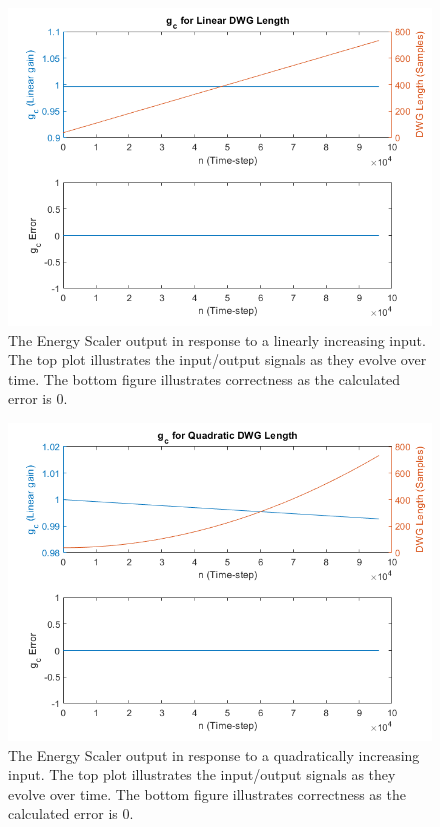 \documentclass[../main.tex]{subfiles}
\begin{document}
\begin{figure}[h!]
    \centering
    \includegraphics[scale=.65]{./images/plots/EnergyScalerLinearIncreasing.png}
    \caption{The Energy Scaler output in response to a linearly increasing input. The top plot illustrates the input/output signals as they evolve over time. The bottom figure illustrates correctness as the calculated error is 0.}
    \label{fig:EnergyScalerLinInc}
\end{figure}

\begin{figure}[h!]
    \centering
    \includegraphics[scale=.60]{./images/plots/EnergyScalerQuadraticIncreasing.png}
    \caption{The Energy Scaler output in response to a quadratically increasing input. The top plot illustrates the input/output signals as they evolve over time. The bottom figure illustrates correctness as the calculated error is 0.}
    \label{fig:EnergyScalerQuadInc}
\end{figure}
\end{document}
